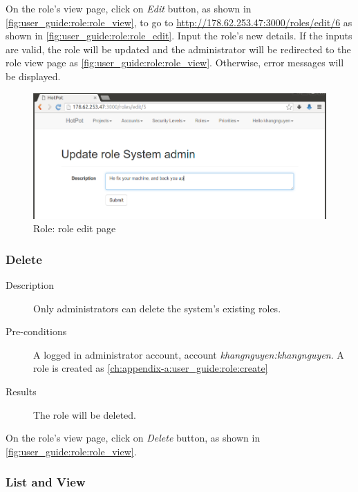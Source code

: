 On the role's view page, click on \emph{Edit} button, as shown in \autoref{fig:user_guide:role:role_view}, 
to go to \href{http://178.62.253.47:3000/roles/edit/6}{http://178.62.253.47:3000/roles/edit/6} as shown in \autoref{fig:user_guide:role:role_edit}.
Input the role's new details.
If the inputs are valid, the role will be updated and the administrator will be redirected to the role view page as \autoref{fig:user_guide:role:role_view}.
Otherwise, error messages will be displayed.

\begin{figure}[bth]
\myfloatalign
\includegraphics[width=1.0\linewidth]{gfx/chapter_5/role/role_edit}
\caption[Role: role edit page]{Role: role edit page}
\label{fig:user_guide:role:role_edit}
\end{figure}

\subsubsection{Delete}
\label{ch:appendix-a:user_guide:role:delete}

\begin{description}
\item[Description] Only administrators can delete the system's existing roles.
\item[Pre-conditions] A logged in administrator account, \eg account \emph{khangnguyen:khangnguyen}.
A role is created as \autoref{ch:appendix-a:user_guide:role:create}
\item[Results] The role will be deleted.
\end{description}

On the role's view page, click on \emph{Delete} button, as shown in \autoref{fig:user_guide:role:role_view}.

\subsubsection{List and View}
\label{ch:appendix-a:user_guide:role:list}

